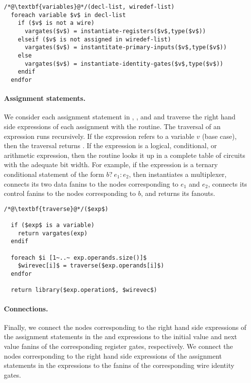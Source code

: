 \begin{lstlisting}
/*@\textbf{variables}@*/(decl-list, wiredef-list)
  foreach variable $v$ in decl-list
    if ($v$ is not a wire) 
      vargates($v$) = instantiate-registers($v$,type($v$))
    elseif ($v$ is not assigned in wiredef-list) 
      vargates($v$) = instantitate-primary-inputs($v$,type($v$))
    else 
      vargates($v$) = instantiate-identity-gates($v$,type($v$))
    endif
  endfor
\end{lstlisting}


\paragraph{Assignment statements.}
We consider each assignment statement in , ,
and  and traverse the right hand side expressions of
each assignment with the  routine. 
The traversal of an expression runs recursively. 
%
If the expression refers to a variable $v$ (base case), 
then the traversal returns . 
%
If the expression is a logical, conditional, or arithmetic expression, then
the  routine looks it up in a complete table of circuits
with the adequate bit width. 
For example, if the expression is a ternary conditional statement of the
form $b?~e_1:e_2$, then  instantiates a multiplexer, 
connects its two data fanins to the nodes corresponding to $e_1$ and $e_2$, 
connects its control fanins to the nodes corresponding to $b$,
and returns its fanouts. 

\begin{lstlisting}
/*@\textbf{traverse}@*/($exp$)

  if ($exp$ is a variable) 
    return vargates(exp)
  endif

  foreach $i [1~..~ exp.operands.size()]$ 
    $wirevec[i]$ = traverse($exp.operands[i]$) 
  endfor

  return library($exp.operation$, $wirevec$)
\end{lstlisting}

\paragraph{Connections.}
Finally, we connect the nodes corresponding to the right hand side expressions 
of the assignment statements in the  and 
expressions 
to the initial value and next value fanins of the corresponding register gates, 
respectively. 
%
We connect the nodes corresponding to the right hand side expressions
of the assignment statements in the  expressions to the 
fanins of the corresponding wire identity gates. 



